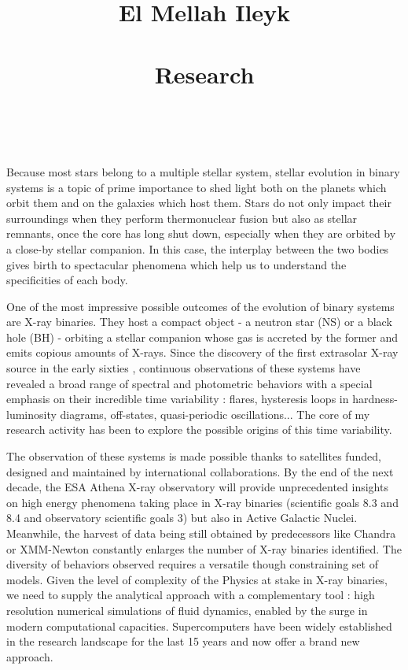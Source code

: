 \documentclass[a4paper,12pt,onecolumn]{article}
\title{	
\vspace*{-2cm}
\normalfont \normalsize 
El Mellah Ileyk \\ [25pt] %
\horrule{0.5pt} \\[0.4cm] %
\huge Research\\ %
\horrule{2pt} \\[0.5cm] %
}
\date{\tiny }%
\makeatletter
\newcommand*{\ns}{NS\@\xspace}
\newcommand*{\bh}{BH\@\xspace}
\makeatother
\begin{document}


\maketitle
\thispagestyle{empty}

\vspace*{-1cm}

Because most stars belong to a multiple stellar system, stellar evolution in binary systems is a topic of prime importance to shed light both on the planets which orbit them and on the galaxies which host them. Stars do not only impact their surroundings when they perform thermonuclear fusion but also as stellar remnants, once the core has long shut down, especially when they are orbited by a close-by stellar companion. In this case, the interplay between the two bodies gives birth to spectacular phenomena which help us to understand the specificities of each body. 

One of the most impressive possible outcomes of the evolution of binary systems are X-ray binaries. They host a compact object - a neutron star (\ns) or a black hole (\bh) - orbiting a stellar companion whose gas is accreted by the former and emits copious amounts of X-rays. Since the discovery of the first extrasolar X-ray source in the early sixties \citep{Giacconi1962}, continuous observations of these systems have revealed a broad range of spectral and photometric behaviors with a special emphasis on their incredible time variability : flares, hysteresis loops in hardness-luminosity diagrams, off-states, quasi-periodic oscillations... The core of my research activity has been to explore the possible origins of this time variability. 

The observation of these systems is made possible thanks to satellites funded, designed and maintained by international collaborations. By the end of the next decade, the ESA Athena X-ray observatory will provide unprecedented insights on high energy phenomena taking place in X-ray binaries (scientific goals 8.3 and 8.4 and observatory scientific goals 3) but also in Active Galactic Nuclei. Meanwhile, the harvest of data being still obtained by predecessors like Chandra or XMM-Newton constantly enlarges the number of X-ray binaries identified. The diversity of behaviors observed requires a versatile though constraining set of models. Given the level of complexity of the Physics at stake in X-ray binaries, we need to supply the analytical approach with a complementary tool : high resolution numerical simulations of fluid dynamics, enabled by the surge in modern computational capacities. Supercomputers have been widely established in the research landscape for the last 15 years and now offer a brand new approach. 
\end{document}
